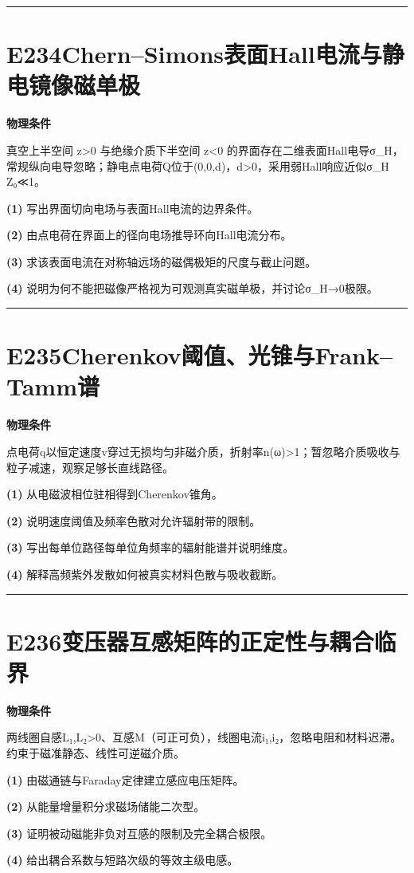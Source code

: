 \documentclass[UTF8,a4paper,11pt,oneside,openany]{ctexbook}
\begin{document}
\par\bigskip\hrule\bigskip
\section*{E234\quad Chern–Simons表面Hall电流与静电镜像磁单极}
\textbf{物理条件}\par 真空上半空间 z>0 与绝缘介质下半空间 z<0 的界面存在二维表面Hall电导σ\_H，常规纵向电导忽略；静电点电荷Q位于(0,0,d)，d>0，采用弱Hall响应近似σ\_H Z₀≪1。
\par\noindent\textbf{(1)} 写出界面切向电场与表面Hall电流的边界条件。
\par\noindent\textbf{(2)} 由点电荷在界面上的径向电场推导环向Hall电流分布。
\par\noindent\textbf{(3)} 求该表面电流在对称轴远场的磁偶极矩的尺度与截止问题。
\par\noindent\textbf{(4)} 说明为何不能把磁像严格视为可观测真实磁单极，并讨论σ\_H→0极限。

\par\bigskip\hrule\bigskip
\section*{E235\quad Cherenkov阈值、光锥与Frank–Tamm谱}
\textbf{物理条件}\par 点电荷q以恒定速度v穿过无损均匀非磁介质，折射率n(ω)>1；暂忽略介质吸收与粒子减速，观察足够长直线路径。
\par\noindent\textbf{(1)} 从电磁波相位驻相得到Cherenkov锥角。
\par\noindent\textbf{(2)} 说明速度阈值及频率色散对允许辐射带的限制。
\par\noindent\textbf{(3)} 写出每单位路径每单位角频率的辐射能谱并说明维度。
\par\noindent\textbf{(4)} 解释高频紫外发散如何被真实材料色散与吸收截断。

\par\bigskip\hrule\bigskip
\section*{E236\quad 变压器互感矩阵的正定性与耦合临界}
\textbf{物理条件}\par 两线圈自感L₁,L₂>0、互感M（可正可负），线圈电流i₁,i₂，忽略电阻和材料迟滞。约束于磁准静态、线性可逆磁介质。
\par\noindent\textbf{(1)} 由磁通链与Faraday定律建立感应电压矩阵。
\par\noindent\textbf{(2)} 从能量增量积分求磁场储能二次型。
\par\noindent\textbf{(3)} 证明被动磁能非负对互感的限制及完全耦合极限。
\par\noindent\textbf{(4)} 给出耦合系数与短路次级的等效主级电感。
\end{document}
